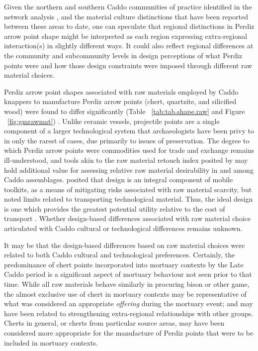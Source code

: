 \documentclass[review]{elsarticle}
\begin{document}
Given the northern and southern Caddo communities of practice identified in the network analysis \citep{RN8031}, and the material culture distinctions that have been reported between these areas to date, one can speculate that regional distinctions in Perdiz arrow point shape might be interpreted as each region expressing extra-regional interaction(s) in slightly different ways. It could also reflect regional differences at the community and subcommunity levels in design perceptions of what Perdiz points were and how those design constraints were imposed through different raw material choices.

Perdiz arrow point shapes associated with raw materials employed by Caddo knappers to manufacture Perdiz arrow points (chert, quartzite, and silicified wood) were found to differ significantly (Table ~\ref{tab:tab.shape.raw} and Figure ~\ref{fig:gmrawmat}) \citep{RN8980}. Unlike ceramic vessels, projectile points are a single component of a larger technological system that archaeologists have been privy to in only the rarest of cases, due primarily to issues of preservation. The degree to which Perdiz arrow points were commodities used for trade and exchange remains ill-understood, and tools akin to the raw material retouch index posited by \citet{RN6541} may hold additional value for assessing relative raw material desirability in and among Caddo assemblages. \citet{RN6363} posited that design is an integral component of mobile toolkits, as a means of mitigating risks associated with raw material scarcity, but noted limits related to transporting technological material. Thus, the ideal design is one which provides the greatest potential utility relative to the cost of transport \citep{RN6363}. Whether design-based differences associated with raw material choice articulated with Caddo cultural or technological differences remains unknown.

It may be that the design-based differences based on raw material choices were related to both Caddo cultural and technological preferences. Certainly, the predominance of chert points incorporated into mortuary contexts by the Late Caddo period is a significant aspect of mortuary behaviour not seen prior to that time. While all raw materials behave similarly in procuring bison or other game, the almost exclusive use of chert in mortuary contexts may be representative of what was considered an appropriate \textit{offering} during the mortuary event; and may have been related to strengthening extra-regional relationships with other groups. Cherts in general, or cherts from particular source areas, may have been considered more appropriate for the manufacture of Perdiz points that were to be included in mortuary contexts.  
\end{document}
